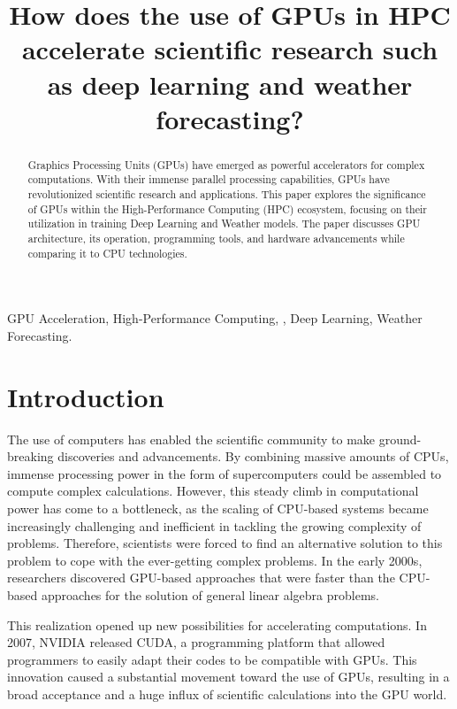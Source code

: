 \documentclass[conference]{IEEEtran}
\begin{document}
\title{How does the use of GPUs in HPC accelerate scientific research such as deep learning and weather forecasting?
}

\author{
\and
{}}

\maketitle

\begin{abstract}
Graphics Processing Units (GPUs) have emerged as powerful accelerators for complex computations. With their immense parallel processing capabilities, GPUs have revolutionized scientific research and applications. This paper explores the significance of GPUs within the High-Performance Computing (HPC) ecosystem, focusing on their utilization in training  Deep Learning and Weather models. The paper discusses GPU architecture, its operation, programming tools, and hardware advancements while comparing it to CPU technologies. 

\end{abstract}

\begin{IEEEkeywords}
GPU Acceleration, High-Performance Computing, , Deep Learning, Weather Forecasting.
\end{IEEEkeywords}

\section{Introduction}
The use of computers has enabled the scientific community to make ground-breaking discoveries and advancements. By combining massive amounts of CPUs, immense processing power in the form of supercomputers could be assembled to compute complex calculations. However, this steady climb in computational power has come to a bottleneck, as the scaling of CPU-based systems became increasingly challenging and inefficient in tackling the growing complexity of problems. Therefore, scientists were forced to find an alternative solution to this problem to cope with the ever-getting complex problems. In the early 2000s, researchers discovered  GPU-based approaches that were faster than the CPU-based approaches for the solution of general linear algebra problems. 

This realization opened up new possibilities for accelerating computations.
 In 2007, NVIDIA released CUDA, a programming platform that allowed programmers to easily adapt their codes to be compatible with GPUs. 
This innovation caused a substantial movement toward the use of GPUs, resulting in a broad acceptance and a huge influx of scientific calculations into the GPU world. \cite{b3} \cite{b26}
\end{document}
